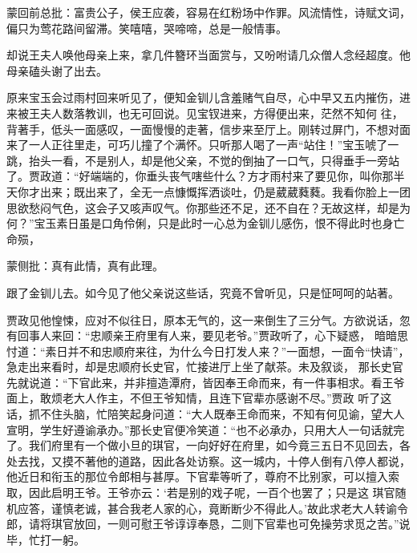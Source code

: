 \begin{parag}

    \begin{note}蒙回前总批：富贵公子，侯王应袭，容易在红粉场中作罪。风流情性，诗赋文词，偏只为莺花路间留滞。笑嘻嘻，哭啼啼，总是一般情事。\end{note}
\end{parag}

\begin{parag}

    却说王夫人唤他母亲上来，拿几件簪环当面赏与，又吩咐请几众僧人念经超度。他母亲磕头谢了出去。
\end{parag}


\begin{parag}


    原来宝玉会过雨村回来听见了，便知金钏儿含羞赌气自尽，心中早又五内摧伤，进来被王夫人数落教训，也无可回说。见宝钗进来，方得便出来，茫然不知何 往，背著手，低头一面感叹，一面慢慢的走著，信步来至厅上。刚转过屏门，不想对面来了一人正往里走，可巧儿撞了个满怀。只听那人喝了一声“站住！”宝玉唬了一跳，抬头一看，不是别人，却是他父亲，不觉的倒抽了一口气，只得垂手一旁站了。贾政道：“好端端的，你垂头丧气嗐些什么？方才雨村来了要见你，叫你那半天你才出来；既出来了，全无一点慷慨挥洒谈吐，仍是葳葳蕤蕤。我看你脸上一团思欲愁闷气色，这会子又咳声叹气。你那些还不足，还不自在？无故这样，却是为何？”宝玉素日虽是口角伶俐，只是此时一心总为金钏儿感伤，恨不得此时也身亡命殒，\begin{note}蒙侧批：真有此情，真有此理。\end{note}跟了金钏儿去。如今见了他父亲说这些话，究竟不曾听见，只是怔呵呵的站著。
\end{parag}


\begin{parag}


    贾政见他惶悚，应对不似往日，原本无气的，这一来倒生了三分气。方欲说话，忽有回事人来回：“忠顺亲王府里有人来，要见老爷。”贾政听了，心下疑惑， 暗暗思忖道：“素日并不和忠顺府来往，为什么今日打发人来？”一面想，一面令“快请”，急走出来看时，却是忠顺府长史官，忙接进厅上坐了献茶。未及叙谈， 那长史官先就说道：“下官此来，并非擅造潭府，皆因奉王命而来，有一件事相求。看王爷面上，敢烦老大人作主，不但王爷知情，且连下官辈亦感谢不尽。”贾政 听了这话，抓不住头脑，忙陪笑起身问道：“大人既奉王命而来，不知有何见谕，望大人宣明，学生好遵谕承办。”那长史官便冷笑道：“也不必承办，只用大人一句话就完了。我们府里有一个做小旦的琪官，一向好好在府里，如今竟三五日不见回去，各处去找，又摸不著他的道路，因此各处访察。这一城内，十停人倒有八停人都说，他近日和衔玉的那位令郎相与甚厚。下官辈等听了，尊府不比别家，可以擅入索取，因此启明王爷。王爷亦云：‘若是别的戏子呢，一百个也罢了；只是这 琪官随机应答，谨慎老诚，甚合我老人家的心，竟断断少不得此人。’故此求老大人转谕令郎，请将琪官放回，一则可慰王爷谆谆奉恳，二则下官辈也可免操劳求觅之苦。”说毕，忙打一躬。
\end{parag}


